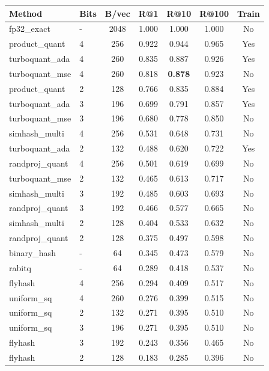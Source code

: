 \begin{tabular}{llccccc}
\toprule
Method & Bits & B/vec & R@1 & R@10 & R@100 & Train \\
\midrule
fp32\_exact & - & 2048 & 1.000 & 1.000 & 1.000 & No \\
product\_quant & 4 & 256 & 0.922 & 0.944 & 0.965 & Yes \\
turboquant\_ada & 4 & 260 & 0.835 & 0.887 & 0.926 & Yes \\
turboquant\_mse & 4 & 260 & 0.818 & \textbf{0.878} & 0.923 & No \\
product\_quant & 2 & 128 & 0.766 & 0.835 & 0.884 & Yes \\
turboquant\_ada & 3 & 196 & 0.699 & 0.791 & 0.857 & Yes \\
turboquant\_mse & 3 & 196 & 0.680 & 0.778 & 0.850 & No \\
simhash\_multi & 4 & 256 & 0.531 & 0.648 & 0.731 & No \\
turboquant\_ada & 2 & 132 & 0.488 & 0.620 & 0.722 & Yes \\
randproj\_quant & 4 & 256 & 0.501 & 0.619 & 0.699 & No \\
turboquant\_mse & 2 & 132 & 0.465 & 0.613 & 0.717 & No \\
simhash\_multi & 3 & 192 & 0.485 & 0.603 & 0.693 & No \\
randproj\_quant & 3 & 192 & 0.466 & 0.577 & 0.665 & No \\
simhash\_multi & 2 & 128 & 0.404 & 0.533 & 0.632 & No \\
randproj\_quant & 2 & 128 & 0.375 & 0.497 & 0.598 & No \\
binary\_hash & - & 64 & 0.345 & 0.473 & 0.579 & No \\
rabitq & - & 64 & 0.289 & 0.418 & 0.537 & No \\
flyhash & 4 & 256 & 0.294 & 0.409 & 0.517 & No \\
uniform\_sq & 4 & 260 & 0.276 & 0.399 & 0.515 & No \\
uniform\_sq & 2 & 132 & 0.271 & 0.395 & 0.510 & No \\
uniform\_sq & 3 & 196 & 0.271 & 0.395 & 0.510 & No \\
flyhash & 3 & 192 & 0.243 & 0.356 & 0.465 & No \\
flyhash & 2 & 128 & 0.183 & 0.285 & 0.396 & No \\
\bottomrule
\end{tabular}

